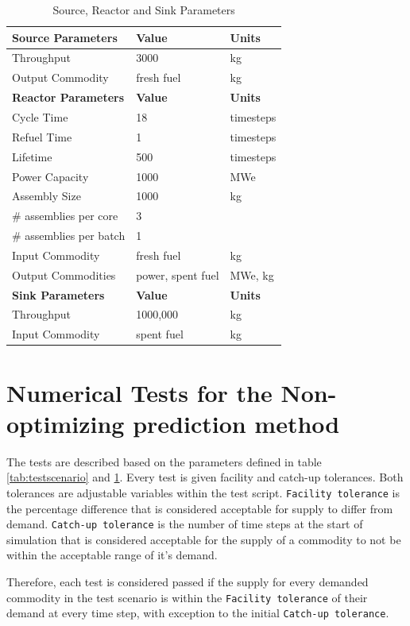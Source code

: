 \documentclass[11pt,letterpaper]{article}
\begin{document}
\begin{table}[H]
	\centering
    \caption {Source, Reactor and Sink Parameters}
	\label{tab:reactor}
	\begin{tabular}{|l|l|l|}
\hline
\textbf{Source Parameters} & \textbf{Value} & \textbf{Units} \\
\hline
Throughput & 3000 & kg \\
Output Commodity & fresh fuel & kg\\
\hline
\textbf{Reactor Parameters} & \textbf{Value} & \textbf{Units} \\
\hline
Cycle Time & 18 & timesteps \\
Refuel Time & 1 & timesteps \\
Lifetime & 500 & timesteps \\
Power Capacity & 1000 & MWe \\
Assembly Size & 1000 & kg \\
\# assemblies per core & 3 & \\
\# assemblies per batch & 1 & \\
Input Commodity & fresh fuel & kg\\
Output Commodities & power, spent fuel & MWe, kg\\
\hline
\textbf{Sink Parameters} & \textbf{Value} & \textbf{Units} \\
Throughput & 1000,000 & kg \\
Input Commodity & spent fuel & kg\\
\hline
	\end{tabular}
\end{table}

\pagebreak

\section{Numerical Tests for the Non-optimizing prediction method}
The tests are described based on the parameters defined in table \ref{tab:testscenario} and \ref{tab:reactor}. Every test is given facility and catch-up tolerances. Both tolerances are adjustable variables within the test script. \texttt{Facility tolerance} is the percentage difference that is considered acceptable for supply to differ from demand.  \texttt{Catch-up tolerance} is the number of time steps at the start of simulation that is considered acceptable for the supply of a commodity to not be within the acceptable range of it's demand. 

Therefore, each test is considered passed if the supply for every demanded commodity in the test scenario is within the \texttt{Facility tolerance} of their demand at every time step, with exception to the initial \texttt{Catch-up tolerance}.   
\end{document}
